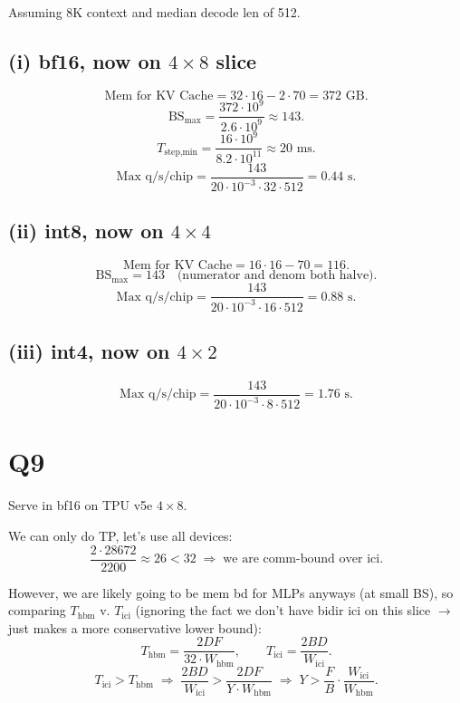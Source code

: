 \documentclass[11pt]{article}
\newcommand{\Tstepmin}{T_{\text{step,min}}}
\newcommand{\Wici}{W_{\text{ici}}}
\newcommand{\Whbm}{W_{\text{hbm}}}
\begin{document}
Assuming 8K context and median decode len of 512.

\subsection*{(i) bf16, now on $4 \times 8$ slice}

\[
\text{Mem for KV Cache} = 32 \cdot 16 - 2 \cdot 70 = 372 \text{ GB.}
\]
\[
\text{BS}_{\max} = \frac{372 \cdot 10^9}{2.6 \cdot 10^9} \approx 143.
\]
\[
\Tstepmin = \frac{16 \cdot 10^9}{8.2 \cdot 10^{11}} \approx 20 \text{ ms.}
\]
\[
\text{Max q/s/chip} = \frac{143}{20 \cdot 10^{-3} \cdot 32 \cdot 512} = 0.44 \text{ s.}
\]

\subsection*{(ii) int8, now on $4 \times 4$}

\[
\text{Mem for KV Cache} = 16 \cdot 16 - 70 = 116.
\]
\[
\text{BS}_{\max} = 143 \quad \text{(numerator and denom both halve).}
\]
\[
\text{Max q/s/chip} = \frac{143}{20 \cdot 10^{-3} \cdot 16 \cdot 512} = 0.88 \text{ s.}
\]

\subsection*{(iii) int4, now on $4 \times 2$}

\[
\text{Max q/s/chip} = \frac{143}{20 \cdot 10^{-3} \cdot 8 \cdot 512} = 1.76 \text{ s.}
\]

\section*{Q9}

Serve in bf16 on TPU v5e $4 \times 8$.

We can only do TP, let's use all devices:
\[
\frac{2 \cdot 28672}{2200} \approx 26 < 32 \;\Rightarrow\; \text{we are comm-bound over ici.}
\]

However, we are likely going to be mem bd for MLPs anyways (at small BS), so comparing $T_{\text{hbm}}$ v. $T_{\text{ici}}$ (ignoring the fact we don't have bidir ici on this slice $\to$ just makes a more conservative lower bound):
\[
T_{\text{hbm}} = \frac{2DF}{32 \cdot \Whbm}, \qquad T_{\text{ici}} = \frac{2BD}{\Wici}.
\]
\[
T_{\text{ici}} > T_{\text{hbm}} \;\Rightarrow\; \frac{2BD}{\Wici} > \frac{2DF}{Y \cdot \Whbm} \;\Rightarrow\; Y > \frac{F}{B} \cdot \frac{\Wici}{\Whbm}.
\]
\end{document}

